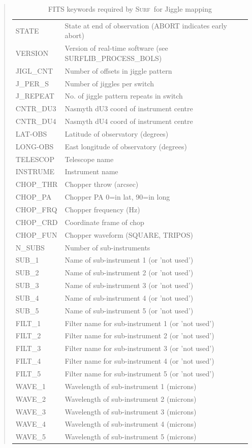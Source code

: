\documentclass[twoside,11pt,nolof]{starlink}
\newenvironment{myquote}{\begin{quote}\begin{small}}{\end{small}\end{quote}}
\providecommand{\scusoft}          {\textsc{Surf}}
\begin{document}
\begin{table}
\begin{myquote}
\begin{tabular}{ll}
STATE & State at end of observation (ABORT indicates early abort)\\
VERSION & Version of real-time software (see SURFLIB\_PROCESS\_BOLS)\\
JIGL\_CNT & Number of offsets in jiggle pattern\\
J\_PER\_S & Number of jiggles per switch\\
J\_REPEAT & No. of jiggle pattern repeats in switch\\
CNTR\_DU3 & Nasmyth  dU3 coord of instrument centre\\
CNTR\_DU4 & Nasmyth dU4 coord of instrument centre\\
LAT-OBS & Latitude of observatory (degrees)\\
LONG-OBS & East longitude of observatory (degrees)\\
TELESCOP & Telescope name\\
INSTRUME & Instrument name\\
CHOP\_THR & Chopper throw (arcsec)\\
CHOP\_PA & Chopper PA 0=in lat, 90=in long\\
CHOP\_FRQ & Chopper frequency (Hz)\\
CHOP\_CRD & Coordinate frame of chop\\
CHOP\_FUN & Chopper waveform (SQUARE, TRIPOS)\\
N\_SUBS   & Number of sub-instruments \\
SUB\_1    & Name of sub-instrument 1 (or 'not used')\\
SUB\_2    & Name of sub-instrument 2 (or 'not used')\\
SUB\_3    & Name of sub-instrument 3 (or 'not used')\\
SUB\_4    & Name of sub-instrument 4 (or 'not used')\\
SUB\_5    & Name of sub-instrument 5 (or 'not used')\\
FILT\_1   & Filter name for sub-instrument 1 (or 'not used')\\
FILT\_2   & Filter name for sub-instrument 2 (or 'not used')\\
FILT\_3   & Filter name for sub-instrument 3 (or 'not used')\\
FILT\_4   & Filter name for sub-instrument 4 (or 'not used')\\
FILT\_5   & Filter name for sub-instrument 5 (or 'not used')\\
WAVE\_1   & Wavelength of sub-instrument 1 (microns)\\
WAVE\_2   & Wavelength of sub-instrument 2 (microns)\\
WAVE\_3   & Wavelength of sub-instrument 3 (microns)\\
WAVE\_4   & Wavelength of sub-instrument 4 (microns)\\
WAVE\_5   & Wavelength of sub-instrument 5 (microns)\\
\end{tabular}
\end{myquote}
\caption{FITS keywords required by \scusoft\ for Jiggle mapping}
\label{tab:jigfits}
\end{table}
\end{document}
